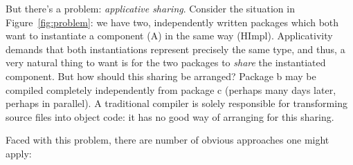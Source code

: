 But there's a problem: \emph{applicative sharing}. Consider the
situation in Figure~\ref{fig:problem}:  we have two, independently
written packages which both want to instantiate a component (A) in the
same way (HImpl).  Applicativity demands that both instantiations
represent precisely the same type, and thus, a very natural thing to
want is for the two packages to \emph{share} the instantiated component.
But how should this sharing be arranged?  Package b may be compiled
completely independently from package c (perhaps many days later,
perhaps in parallel).  A traditional compiler is solely responsible for
transforming source files into object code: it has no good way of
arranging for this sharing.

Faced with this problem, there are number of obvious approaches one
might apply:

